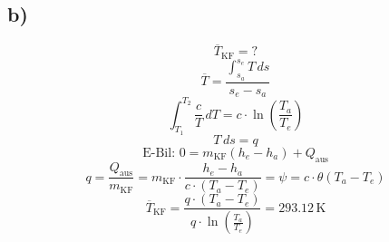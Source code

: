 

\subsection*{b)}
\[
\overline{T}_{\text{KF}} = ?
\]
\[
\overline{T} = \frac{\int_{s_a}^{s_e} T \, ds}{s_e - s_a}
\]
\[
\int_{T_1}^{T_2} \frac{c}{T} \, dT = c \cdot \ln \left( \frac{T_a}{T_e} \right)
\]
\[
T \, ds = q
\]
\[
\text{E-Bil: } 0 = m_{\text{KF}} (h_e - h_a) + Q_{\text{aus}}
\]
\[
q = \frac{Q_{\text{aus}}}{m_{\text{KF}}} = m_{\text{KF}} \cdot \frac{h_e - h_a}{c \cdot (T_a - T_e)} = \psi = c \cdot \theta (T_a - T_e)
\]
\[
\overline{T}_{\text{KF}} = \frac{q \cdot (T_a - T_e)}{q \cdot \ln \left( \frac{T_a}{T_e} \right)} = 293.12 \, \text{K}
\]
